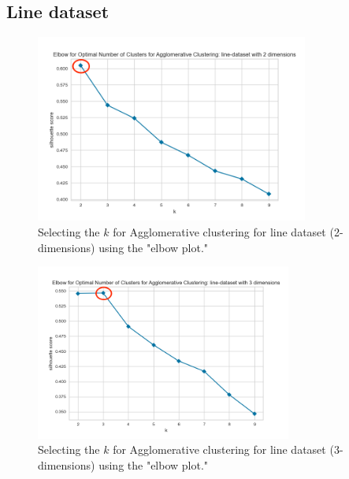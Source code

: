 \subsection{Line dataset}
\begin{figure}[H]
  \includegraphics[width=0.8\textwidth]{Method/images/k-values/line-dataset-2-agglomerative.png}
  \caption{Selecting the $k$ for Agglomerative clustering for line dataset (2-dimensions) using the "elbow plot."}
  \label{hyperparameters:agglomerative-line-dataset-2d}
\end{figure}
\begin{figure}[H]
  \includegraphics[width=0.75\textwidth]{Method/images/k-values/line-dataset-3-agglomerative.png}
  \caption{Selecting the $k$ for Agglomerative clustering for line dataset (3-dimensions) using the "elbow plot."}
  \label{hyperparameters:agglomerative-line-dataset-3d}
\end{figure}
\newpage
